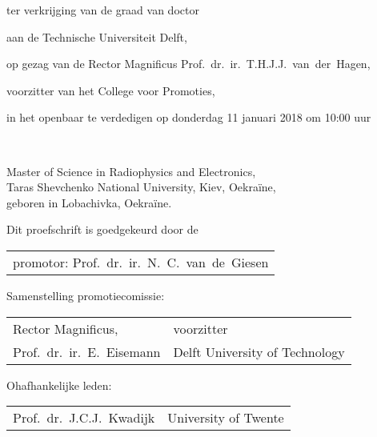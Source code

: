 \begin{titlepage}
\begin{center}
	ter verkrijging van de graad van doctor
	
	aan de Technische Universiteit Delft,
	
	op gezag van de Rector Magnificus Prof.~dr.~ir.~T.H.J.J.~van~der~Hagen,
	
	voorzitter van het College voor Promoties,
	
	in het openbaar te verdedigen op donderdag 11 januari 2018 om 10:00 uur
	
	\bigskip
	\bigskip
	
	
	\bigskip
	\bigskip
	
	\makeatletter
	{\Large\titlefont\bfseries\@firstname\ {\titleshape\@lastname}}
	\makeatother
	
	\bigskip
	\bigskip
	
	Master of Science in Radiophysics and Electronics, \\
	Taras Shevchenko National University, Kiev, Oekraïne, \\
	geboren in Lobachivka, Oekraïne.
	
	\vspace*{2\bigskipamount}
	
\end{center}

\clearpage
\thispagestyle{empty}

\noindent Dit proefschrift is goedgekeurd door de

\medskip\noindent
\begin{tabular}{l}
	promotor: Prof.\ dr.\ ir.\ N.\ C.\ van\ de\ Giesen
\end{tabular}

\bigskip
\noindent Samenstelling promotiecomissie:

\medskip
\begin{tabular}{p{5cm}l}
	Rector Magnificus, & voorzitter \\
	
	Prof.\ dr.\ ir.\ E.\ Eisemann & Delft University of Technology \\
\end{tabular}
	
\medskip	
\noindent Ohafhankelijke leden:	

\begin{tabular}{p{5cm}l}
	Prof.\ dr.\ J.C.J.\ Kwadijk & University of Twente \\
	

\end{tabular}
\end{titlepage}
